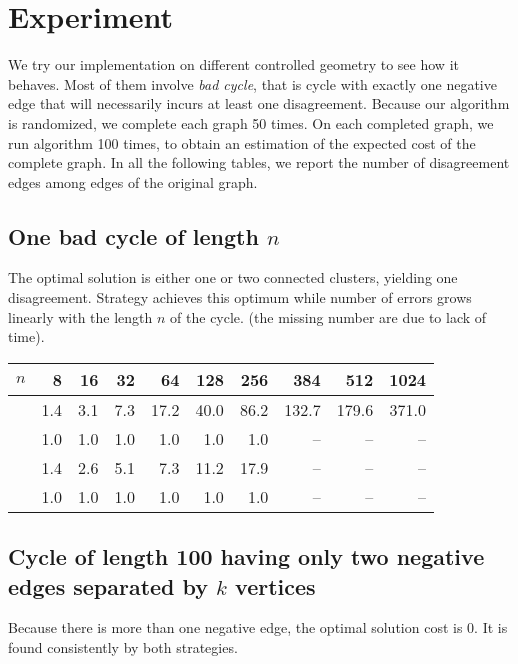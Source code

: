 \section{Experiment}

We try our implementation on different controlled geometry to see how it
behaves. Most of them involve \emph{bad cycle}, that is cycle with exactly one
negative edge that will necessarily incurs at least one disagreement.  Because
our algorithm is randomized, we complete each graph 50 times.  On each
completed graph, we run \ccp{} algorithm 100 times, to obtain an estimation of
the expected cost of the complete graph. In all the following tables, we
report the number of disagreement edges among edges of the original graph.

\subsection{One bad cycle of length $n$}
\label{sub:cycle}

The optimal solution is either one or two connected clusters, yielding one
disagreement. Strategy \pat{} achieves this optimum while \pot{} number of
errors grows linearly with the length $n$ of the cycle. (the missing number
are due to lack of time).

\begin{center}
\begin{tabular}{lrrrrrrrrr}
\toprule
$n$      & 8   & 16  & 32  & 64   & 128  & 256  & 384   & 512   & 1024 \\
\midrule
\pot{}   & 1.4 & 3.1 & 7.3 & 17.2 & 40.0 & 86.2 & 132.7 & 179.6 & 371.0 \\
\pat{}   & 1.0 & 1.0 & 1.0 & 1.0  & 1.0  & 1.0  & --    & --    & -- \\
\nnot{}  & 1.4 & 2.6 & 5.1 & 7.3  & 11.2 & 17.9 & --    & --    & --\\
\nat{}   & 1.0 & 1.0 & 1.0 & 1.0  & 1.0  & 1.0  & --    & --    & --\\
\bottomrule
\end{tabular}
\end{center}



\subsection{Cycle of length 100 having only two negative edges separated by
	$k$ vertices}
Because there is more than one negative edge, the optimal solution cost is 0.
It is found consistently by both strategies.

